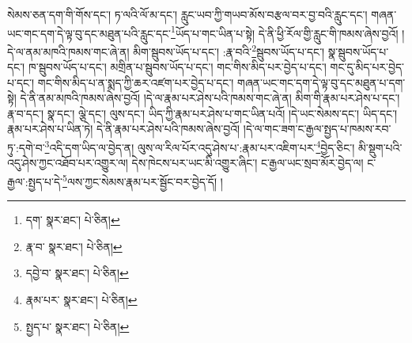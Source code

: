 སེམས་ཅན་དག་གི་གོས་དང་། ཏ་ལའི་ལོ་མ་དང་། རླུང་ཡབ་ཀྱི་གཡབ་མོས་བརྩལ་བར་བྱ་བའི་རླུང་དང་། གཞན་ཡང་གང་དག་དེ་ལྟ་བུ་དང་མཐུན་པའི་རླུང་དང་\footnote{དག་  སྣར་ཐང་།  པེ་ཅིན། }ཡོད་པ་གང་ཡིན་པ་སྟེ། དེ་ནི་ཕྱི་རོལ་གྱི་རླུང་གི་ཁམས་ཞེས་བྱའོ། །དེ་ལ་ནམ་མཁའི་ཁམས་གང་ཞེ་ན། མིག་སྦུབས་ཡོད་པ་དང་། :རྣ་བའི་\footnote{རྣ་བ་  སྣར་ཐང་།  པེ་ཅིན། }སྦུབས་ཡོད་པ་དང་། སྣ་སྦུབས་ཡོད་པ་དང་། ཁ་སྦུབས་ཡོད་པ་དང་། མགྲིན་པ་སྦུབས་ཡོད་པ་དང་། གང་གིས་མིད་པར་བྱེད་པ་དང་། གང་དུ་མིད་པར་བྱེད་པ་དང་། གང་གིས་མིད་པ་ན་སྨད་ཀྱི་ཆར་འཛག་པར་བྱེད་པ་དང་། གཞན་ཡང་གང་དག་དེ་ལྟ་བུ་དང་མཐུན་པ་དག་སྟེ། དེ་ནི་ནམ་མཁའི་ཁམས་ཞེས་བྱའོ། །དེ་ལ་རྣམ་པར་ཤེས་པའི་ཁམས་གང་ཞེ་ན། མིག་གི་རྣམ་པར་ཤེས་པ་དང་། རྣ་བ་དང་། སྣ་དང་། ལྕེ་དང་། ལུས་དང་། ཡིད་ཀྱི་རྣམ་པར་ཤེས་པ་གང་ཡིན་པའོ། །དེ་ཡང་སེམས་དང་། ཡིད་དང་། རྣམ་པར་ཤེས་པ་ཡིན་ཏེ། དེ་ནི་རྣམ་པར་ཤེས་པའི་ཁམས་ཞེས་བྱའོ། །དེ་ལ་གང་ཟག་ང་རྒྱལ་སྤྱད་པ་ཁམས་རབ་ཏུ་:དགེ་བ་\footnote{དབྱེ་བ་  སྣར་ཐང་།  པེ་ཅིན། }འདི་དག་ཡིད་ལ་བྱེད་ན། ལུས་ལ་རིལ་པོར་འདུ་ཤེས་པ་:རྣམ་པར་འཇིག་པར་\footnote{རྣམ་པར་  སྣར་ཐང་།  པེ་ཅིན། }བྱེད་ཅིང་། མི་སྡུག་པའི་འདུ་ཤེས་ཀྱང་འཐོབ་པར་འགྱུར་ལ། དེས་ཁེངས་པར་ཡང་མི་འགྱུར་ཞིང་། ང་རྒྱལ་ཡང་སྲབ་མོར་བྱེད་ལ། ང་རྒྱལ་:སྤྱད་པ་དེ་\footnote{སྤྱད་པ་  སྣར་ཐང་།  པེ་ཅིན། }ལས་ཀྱང་སེམས་རྣམ་པར་སྦྱོང་བར་བྱེད་དོ། །
